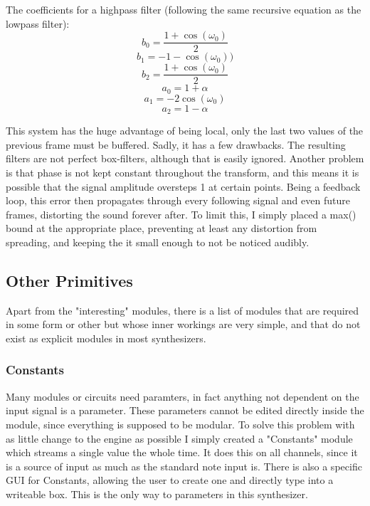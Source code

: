 \documentclass[11pt,a4paper]{article}
\begin{document}
The coefficients for a highpass filter (following the same recursive equation as the lowpass filter):
\begin{equation}
b_0 = \frac{1 + \cos(\omega_0)}{2}
\end{equation}
\begin{equation}
b_1 = -1 - \cos(\omega_0))
\end{equation}
\begin{equation}
b_2 = \frac{1 + \cos(\omega_0)}{2}
\end{equation}
\begin{equation}
a_0 = 1 + \alpha
\end{equation}
\begin{equation}
a_1 = -2\cos(\omega_0)
\end{equation}
\begin{equation}
a_2 = 1 - \alpha
\end{equation}

This system has the huge advantage of being local, only the last two values of the previous frame must be buffered.
Sadly, it has a few drawbacks. The resulting filters are not perfect box-filters, although that is easily ignored. Another problem is that phase is not kept constant throughout the transform, and this means it is possible that the signal amplitude oversteps 1 at certain points. Being a feedback loop, this error then propagates through every following signal and even future frames, distorting the sound forever after.
To limit this, I simply placed a max() bound at the appropriate place, preventing at least any distortion from spreading, and keeping the it small enough to not be noticed audibly.

\subsection{Other Primitives}

Apart from the "interesting" modules, there is a list of modules that are required in some form or other but whose inner workings are very simple, and that do not exist as explicit modules in most synthesizers.

\subsubsection{Constants}

Many modules or circuits need paramters, in fact anything not dependent on the input signal is a parameter. These parameters cannot be edited directly inside the module, since everything is supposed to be modular. To solve this problem with as little change to the engine as possible I simply created a "Constants" module which streams a single value the whole time. It does this on all channels, since it is a source of input as much as the standard note input is. There is also a specific GUI for Constants, allowing the user to create one and directly type into a writeable box. This is the only way to parameters in this synthesizer.
\end{document}
